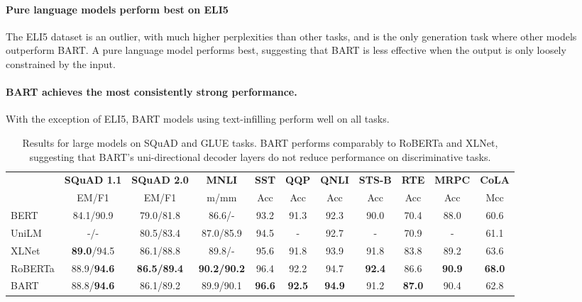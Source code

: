 \documentclass{article} %
\newcommand{\omer}[1]{{\color{blue} [Omer: #1]}}
\begin{document}
\paragraph{Pure language models perform best on ELI5} The ELI5 dataset is an outlier, with much higher perplexities than other tasks, and is the only generation task where other models outperform BART. A pure language model performs best, suggesting that BART is less effective when the output is only loosely constrained by the input.

\paragraph{BART achieves the most consistently strong performance.} With the exception of ELI5, BART models using text-infilling perform well on all tasks.



\begin{table}[h!t]
\centering
\begin{tabular}{lcccccccccc}
\toprule
        & \textbf{SQuAD 1.1} & \textbf{SQuAD 2.0} & \textbf{MNLI} & \textbf{SST} & \textbf{QQP}	& \textbf{QNLI} &  \textbf{STS-B}& \textbf{RTE}&  \textbf{MRPC} & \textbf{CoLA}\\
        &   EM/F1  &  EM/F1    & m/mm &Acc &Acc& Acc
        &Acc&Acc&Acc&Mcc\\
\midrule
BERT  & 84.1/90.9 &  79.0/81.8  & 86.6/-  & 93.2      & 91.3&92.3&90.0&70.4&88.0&60.6   \\
UniLM   &     -/-    &    80.5/83.4 &  87.0/85.9  &  94.5    &  - & 92.7 & -&70.9&-&61.1 \\
XLNet   &   \textbf{89.0}/94.5  &86.1/88.8  &  89.8/- &  95.6    &  91.8&93.9&91.8 &83.8&89.2 &63.6  \\
RoBERTa &  88.9/\textbf{94.6} &  \textbf{86.5/89.4}  &  \textbf{90.2/90.2}& 96.4     &  92.2	&94.7	&\textbf{92.4}	&86.6&	\textbf{90.9}&	\textbf{68.0}
   \\
BART    &  88.8/\textbf{94.6} & 86.1/89.2  &  89.9/90.1   &   \textbf{96.6} 
&  \textbf{92.5}	&\textbf{94.9}&	91.2&	\textbf{87.0}&	90.4	&62.8
\\
\bottomrule
\end{tabular}
\caption{\label{table:discriminative}Results for large models on SQuAD and GLUE tasks. BART performs comparably to RoBERTa and XLNet, suggesting that BART's uni-directional decoder layers do not reduce performance on discriminative tasks.%
}
\end{table}
\end{document}
